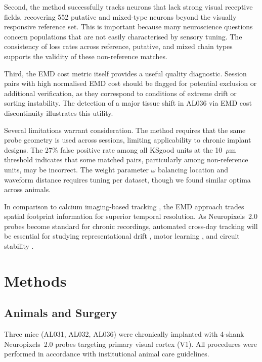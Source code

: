 \documentclass[11pt]{article}
\begin{document}
Second, the method successfully tracks neurons that lack strong visual receptive fields, recovering 552 putative and mixed-type neurons beyond the visually responsive reference set. This is important because many neuroscience questions concern populations that are not easily characterised by sensory tuning. The consistency of loss rates across reference, putative, and mixed chain types supports the validity of these non-reference matches.

Third, the EMD cost metric itself provides a useful quality diagnostic. Session pairs with high normalised EMD cost should be flagged for potential exclusion or additional verification, as they correspond to conditions of extreme drift or sorting instability. The detection of a major tissue shift in AL036 via EMD cost discontinuity illustrates this utility.

Several limitations warrant consideration. The method requires that the same probe geometry is used across sessions, limiting applicability to chronic implant designs. The 27\% false positive rate among all KSgood units at the 10~$\mu$m threshold indicates that some matched pairs, particularly among non-reference units, may be incorrect. The weight parameter $\omega$ balancing location and waveform distance requires tuning per dataset, though we found similar optima across animals.

In comparison to calcium imaging-based tracking \citep{sheintuch2017tracking}, the EMD approach trades spatial footprint information for superior temporal resolution. As Neuropixels~2.0 probes \citep{steinmetz2021neuropixels} become standard for chronic recordings, automated cross-day tracking will be essential for studying representational drift \citep{deitch2021representational}, motor learning \citep{gallego2020long}, and circuit stability \citep{luo2020stable}.

\section{Methods}

\subsection{Animals and Surgery}

Three mice (AL031, AL032, AL036) were chronically implanted with 4-shank Neuropixels~2.0 probes \citep{steinmetz2021neuropixels} targeting primary visual cortex (V1). All procedures were performed in accordance with institutional animal care guidelines.
\end{document}
